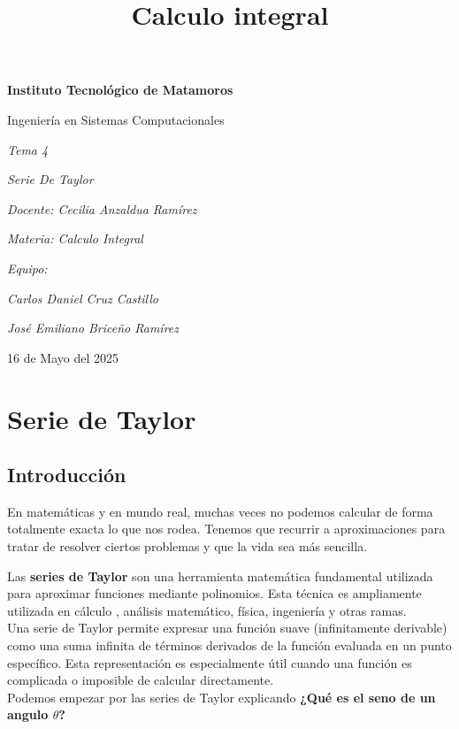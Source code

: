 \documentclass[12pt, a4paper, oneside]{article}
\title{Calculo integral}
\begin{document}
\begin{titlepage}
 \centering
 {\bfseries\LARGE Instituto Tecnológico de Matamoros \par}
 \vspace{1cm}
 {\Large Ingeniería en Sistemas Computacionales \par}
 \vspace{3cm}
 {\Huge \it Tema 4  \par}
 {\Huge \it Serie De Taylor \par}
 \vspace{3cm}
 {\itshape\large Docente: Cecilia Anzaldua Ramírez \par}
 {\itshape\large Materia: Calculo Integral \par}
 \vfill
 {\itshape\large Equipo: \par}
 {\itshape\large Carlos Daniel Cruz Castillo \par}
 {\itshape\large José Emiliano Briceño Ramírez}
 \vfill
 {\large 16 de Mayo del 2025 \par}

\end{titlepage}

\section{Serie de Taylor}
\subsection{Introducción}
En matemáticas y en mundo real, muchas veces no podemos calcular de 
forma totalmente exacta lo que nos rodea. Tenemos que recurrir a 
aproximaciones para tratar de resolver ciertos problemas y que la 
vida sea más sencilla.
\par

Las \textbf{series de Taylor} son una herramienta matemática fundamental 
utilizada para aproximar funciones mediante polinomios. Esta técnica es
ampliamente utilizada en cálculo , análisis matemático, física,
ingeniería y otras ramas.\\

Una serie de Taylor permite expresar una función suave (infinitamente 
derivable) como una suma infinita de términos derivados de la función
evaluada en un punto específico. Esta representación es especialmente 
útil cuando una función es complicada o imposible de calcular
directamente.\\

Podemos empezar por las series de Taylor explicando \textbf{¿Qué es 
el seno de un angulo $\theta$?}
\end{document}
